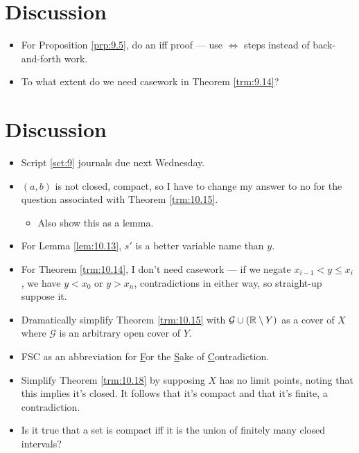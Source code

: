 \documentclass{report}
\begin{document}



\section{Discussion}
\begin{itemize}
    \item {}For Proposition \ref{prp:9.5}, do an iff proof --- use $\Longleftrightarrow$ steps instead of back-and-forth work.
    \item {}To what extent do we need casework in Theorem \ref{trm:9.14}?
\end{itemize}






\section{Discussion}
\begin{itemize}
    \item {}Script \ref{sct:9} journals due next Wednesday.
    \item {}$(a,b)$ is not closed, compact, so I have to change my answer to no for the question associated with Theorem \ref{trm:10.15}.
    \begin{itemize}
        \item Also show this as a lemma.
    \end{itemize}
    \item For Lemma \ref{lem:10.13}, $s'$ is a better variable name than $y$.
    \item For Theorem \ref{trm:10.14}, I don't need casework --- if we negate $x_{i-1}<y\leq x_i$, we have $y<x_0$ or $y>x_n$, contradictions in either way, so straight-up suppose it.
    \item Dramatically simplify Theorem \ref{trm:10.15} with $\mathcal{G}\cup(\mathbb{R}\setminus Y)$ as a cover of $X$ where $\mathcal{G}$ is an arbitrary open cover of $Y$.
    \item FSC as an abbreviation for \underline{F}or the \underline{S}ake of \underline{C}ontradiction.
    \item Simplify Theorem \ref{trm:10.18} by supposing $X$ has no limit points, noting that this implies it's closed. It follows that it's compact and that it's finite, a contradiction.
    \item Is it true that a set is compact iff it is the union of finitely many closed intervals?
\end{itemize}
\end{document}
